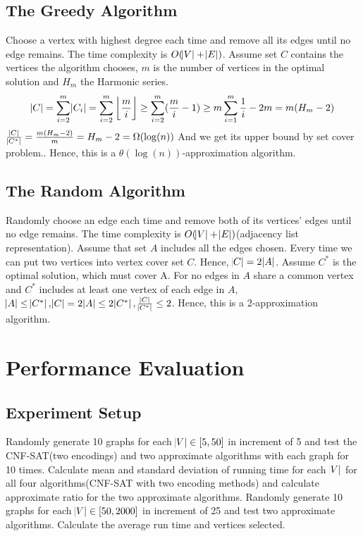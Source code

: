 \documentclass[11pt]{article}
\begin{document}
\subsection{The Greedy Algorithm}
Choose a vertex with highest degree each time and remove all its edges until no edge remains. The time complexity is $O(\abs{V}+\abs{E})$. Assume set $C$ contains the vertices the algorithm chooses, $m$ is the number of vertices in the optimal solution and $H_m$ the Harmonic series. \[\abs{C} = \sum_{i = 2}^{m}\abs{C_i}=\sum_{i = 2}^{m}\left \lfloor \frac{m}{i} \right \rfloor\geq\sum_{i = 2}^{m}(\frac{m}{i} - 1)\geq m\sum_{i = 1}^{m}\frac{1}{i} - 2m = m(H_m - 2)\]
$\frac{\abs{C}}{\abs{C^*}}=\frac{m(H_m - 2)}{m}=H_m - 2=\Omega(\log(n))$ And we get its upper bound by set cover problem.\cite{Cormen:2009:IAT:1614191}. Hence, this is a $\theta(\log(n))$-approximation algorithm.
\subsection{The Random Algorithm}
Randomly choose an edge each time and remove both of its vertices' edges until no edge remains. The time complexity is $O(\abs{V}+\abs{E})$(adjacency list representation). Assume that set $A$ includes all the edges chosen. Every time we can put two vertices into vertex cover set $C$. Hence, $\abs{C} = 2\abs{A}$. Assume $C^*$ is the optimal solution, which must cover A. For no edges in $A$ share a common vertex and $C^*$ includes at least one vertex of each edge in $A$, $\abs{A}\leq\abs{C^*},\abs{C}=2\abs{A}\leq2\abs{C^*}, \frac{\abs{C}}{\abs{C^*}}\leq 2$. Hence, this is a 2-approximation algorithm\cite{Cormen:2009:IAT:1614191}.
\section{Performance Evaluation}\label{section-experiment}
\subsection{Experiment Setup}
Randomly generate 10 graphs for each $\abs{V} \in [5,50]$ in increment of 5 and test the CNF-SAT(two encodings) and two approximate algorithms with each graph for 10 times. Calculate mean and standard deviation of running time for each $\abs{V}$ for all four algorithms(CNF-SAT with two encoding methods) and calculate approximate ratio for the two approximate algorithms. Randomly generate 10 graphs for each $\abs{V} \in [50,2000]$ in increment of 25 and test two approximate algorithms. Calculate the average run time and vertices selected.
\end{document}

